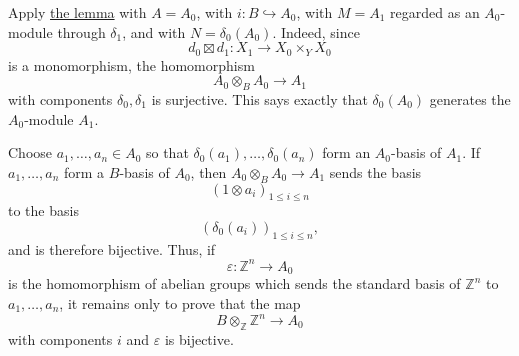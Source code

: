 Apply \hyperref[lem:sga3-V-4.2]{the lemma} with \(A=A_0\), with \(i:B\hookrightarrow A_0\), with
\(M=A_1\) regarded as an \(A_0\)-module through \(\delta_1\), and with
\(N=\delta_0(A_0)\). Indeed, since
\[
  d_0\boxtimes d_1:X_1\longrightarrow X_0\times_YX_0
\]
is a monomorphism, the homomorphism
\[
  A_0\otimes_BA_0\longrightarrow A_1
\]
with components \(\delta_0,\delta_1\) is surjective. This says exactly
that \(\delta_0(A_0)\) generates the \(A_0\)-module \(A_1\).

Choose \(a_1,\ldots,a_n\in A_0\) so that
\(\delta_0(a_1),\ldots,\delta_0(a_n)\) form an \(A_0\)-basis of
\(A_1\). If \(a_1,\ldots,a_n\) form a \(B\)-basis of \(A_0\), then
\(A_0\otimes_BA_0\to A_1\) sends the basis
\[
  (1\otimes a_i)_{1\leq i\leq n}
\]
to the basis
\[
  (\delta_0(a_i))_{1\leq i\leq n},
\]
and is therefore bijective. Thus, if
\[
  \varepsilon:\mathbb Z^n\longrightarrow A_0
\]
is the homomorphism of abelian groups which sends the standard basis
of \(\mathbb Z^n\) to \(a_1,\ldots,a_n\), it remains only to prove
that the map
\[
  B\otimes_{\mathbb Z}\mathbb Z^n\longrightarrow A_0
\]
with components \(i\) and \(\varepsilon\) is bijective.
